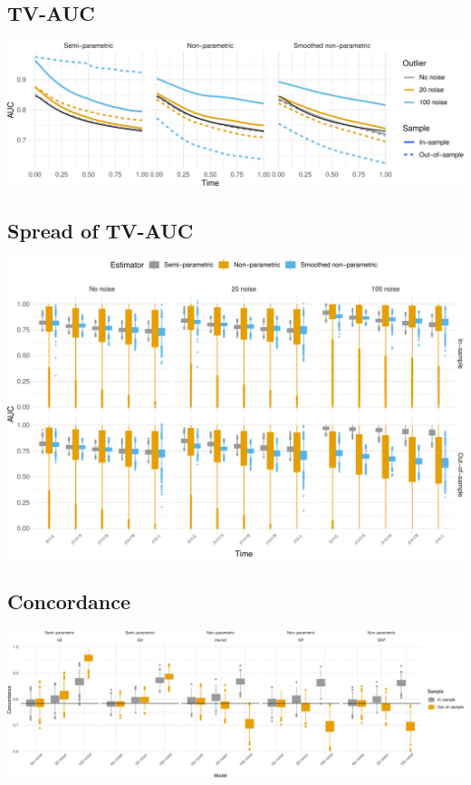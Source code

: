 \documentclass[
]{article}
\begin{document}
\hypertarget{tv-auc-1}{%
\subsection{TV-AUC}\label{tv-auc-1}}

\includegraphics{ProgressReport_files/figure-latex/fig_tv_auc_noise-1.pdf}

\hypertarget{spread-of-tv-auc-1}{%
\subsection{Spread of TV-AUC}\label{spread-of-tv-auc-1}}

\includegraphics{ProgressReport_files/figure-latex/fig_tvauc_box_ovefit-1.pdf}

\hypertarget{concordance-1}{%
\subsection{Concordance}\label{concordance-1}}

\includegraphics{ProgressReport_files/figure-latex/fig_c_noise-1.pdf}
\end{document}
